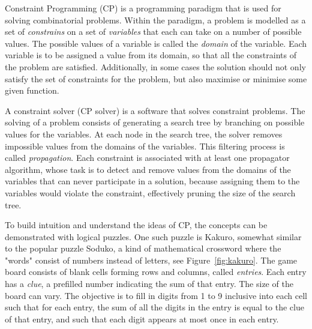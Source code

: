 \documentclass[a4paper,11pt]{article}
\numberwithin{equation}{section}
\begin{document}
Constraint Programming (CP) is a programming paradigm that is used for solving
combinatorial problems.
Within the paradigm, a problem is
modelled as a set of \emph{constrains} on a
set of \emph{variables} that each can take on a number of
possible values. The possible values of 
a variable is called the \emph{domain} of the variable.
Each variable is to be assigned a value
from its domain, so that all the constraints of the problem
are satisfied. Additionally, in some cases the solution should not only
satisfy the set of constraints for the
problem, but also maximise or minimise some given function.

A constraint solver (CP solver) is a software that solves constraint problems.
The solving of a problem consists of generating a search tree by branching
on possible values for the variables. At each node in the search tree,
the solver removes impossible values from the domains of the variables.
This filtering process is called \emph{propagation}. Each constraint is
associated with at least one propagator algorithm, whose task is to detect
and remove values from the domains of the variables
that can never participate in a solution, because assigning them to
the variables would violate the constraint,
effectively pruning the size of the search tree.

To build intuition and understand the ideas of CP,
the concepts can be demonstrated with logical puzzles. One such
puzzle is Kakuro, somewhat similar to the popular puzzle Soduko,
a kind of mathematical crossword where the "words" consist
of numbers instead of letters, see Figure~\ref{fig:kakuro}.
The game board consists of 
blank cells forming rows and columns, called \emph{entries}.
Each entry has a \emph{clue}, a prefilled number indicating the sum of that entry.
The size of the board can vary.
The objective is to fill
in digits from 1 to 9 inclusive into each cell such that for each entry,
the sum of all the digits in the entry is equal to the clue of that entry,
and such that each digit appears at most once in each entry.
\end{document}
